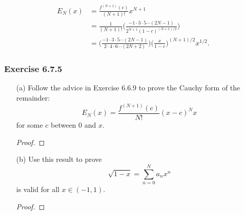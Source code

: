 \begin{align*}
   E_{N}(x)  &= \frac{ f^{(N+1)}(c)  }{ (N+1)! } x^{N+1}  \\
             &= \frac{ 1 }{ (N+1)! } \Big( \frac{ -1 \cdot 3 \cdot 5 \dotsb (2N-1) }{ 2^{N+1} (1-c)^{(N+1)/2} }  \Big) \\
             &= \Big( \frac{ -1 \cdot 3 \cdot 5 \dotsb (2N-1) }{ 2 \cdot 4 \cdot 6 \dotsb (2N+2) }  \Big) \Big( \frac{ x  }{ 1 -c  }  \Big)^{(N+1)/2} x^{1/2}.
\end{align*}

\subsubsection{Exercise 6.7.5} 
\begin{enumerate}
    \item[(a)] Follow the advice in Exercise 6.6.9 to prove the Cauchy form of the remainder:
        \[ E_{N}(x) = \frac{ f^{(N+1)}(c)  }{ N! } (x-c)^{N}x \]
        for some \( c  \) between \( 0  \) and \( x  \).
        \begin{proof}
        
        \end{proof}
    \item[(b)] Use this result to prove 
      \[  \sqrt{ 1-x } = \sum_{ n=0 }^{ N } a_{n} x^{n} \] 
        is valid for all \( x \in (-1,1) \).
        \begin{proof}
        
        \end{proof}
\end{enumerate}






